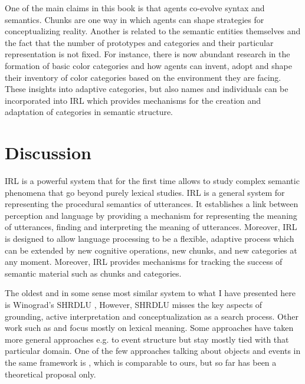 One of the main claims in this book is that agents co-evolve syntax 
and semantics. Chunks are one way in which agents can
shape strategies for conceptualizing reality. Another
is related to the semantic entities themselves and the fact that the
number of prototypes and categories and their particular 
representation is not fixed. For instance, there is now 
abundant research in the formation of basic color categories 
\citep{steels2005coordinating,belpaeme2007language}
and how agents can invent, adopt and shape their inventory
of color categories based on the environment they are
facing. These insights into adaptive categories,
but also names and individuals can be incorporated into
IRL which provides mechanisms for the creation and
adaptation of categories in semantic structure.


\section{Discussion}
IRL is a powerful system that for the first time allows 
to study complex semantic phenomena that go beyond
purely lexical studies. IRL is a general system for 
representing the procedural semantics
of utterances. It establishes a link between perception and
language by providing a mechanism for representing the meaning
of utterances, finding and interpreting the meaning of utterances.
Moreover, IRL is designed to allow language processing
to be a flexible, adaptive process which can be extended
by new cognitive operations, new chunks, and new categories 
at any moment. Moreover, IRL provides mechanisms for
tracking the success of semantic material such as 
chunks and categories. 


The oldest and in some sense most similar system 
to what I have presented here is Winograd's SHRDLU 
\citep{haddock1989computational,winograd1971procedures}, However, SHRDLU misses the key aspects of grounding, active interpretation and conceptualization 
as a search process. Other work such as \cite{bailey1997modeling}
and \cite{siskind2001grounding} 
focus mostly on lexical meaning. Some approaches
have taken more general approaches e.g. to event structure \citep{narayanan1999moving} 
but stay mostly tied with that particular domain. One of the few approaches talking about 
objects and events in the same framework is \cite{roy2005semiotic}, which is comparable 
to ours, but so far has been a theoretical proposal only.


%
% 
%


